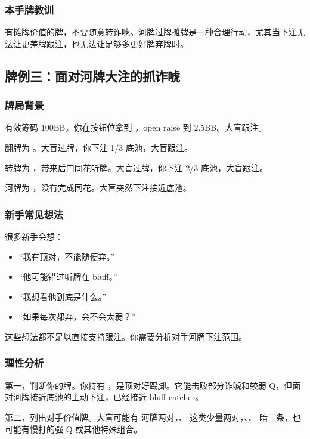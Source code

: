 \subsubsection*{本手牌教训}

有摊牌价值的牌，不要随意转诈唬。河牌过牌摊牌是一种合理行动，尤其当下注无法让更差牌跟注，也无法让足够多更好牌弃牌时。

\subsection{牌例三：面对河牌大注的抓诈唬}

\subsubsection*{牌局背景}

有效筹码 100BB。你在按钮位拿到 ，open raise 到 2.5BB。大盲跟注。

翻牌为 。大盲过牌，你下注 1/3 底池，大盲跟注。

转牌为 ，带来后门同花听牌。大盲过牌，你下注 2/3 底池，大盲跟注。

河牌为 ，没有完成同花。大盲突然下注接近底池。

\subsubsection*{新手常见想法}

很多新手会想：

\begin{itemize}
\item “我有顶对，不能随便弃。”
\item “他可能错过听牌在 bluff。”
\item “我想看他到底是什么。”
\item “如果每次都弃，会不会太弱？”
\end{itemize}

这些想法都不足以直接支持跟注。你需要分析对手河牌下注范围。

\subsubsection*{理性分析}

第一，判断你的牌。你持有 ，是顶对好踢脚。它能击败部分诈唬和较弱 Q，但面对河牌接近底池的主动下注，已经接近 bluff-catcher。

第二，列出对手价值牌。大盲可能有  河牌两对，、 这类少量两对，、、 暗三条，也可能有慢打的强 Q 或其他特殊组合。

